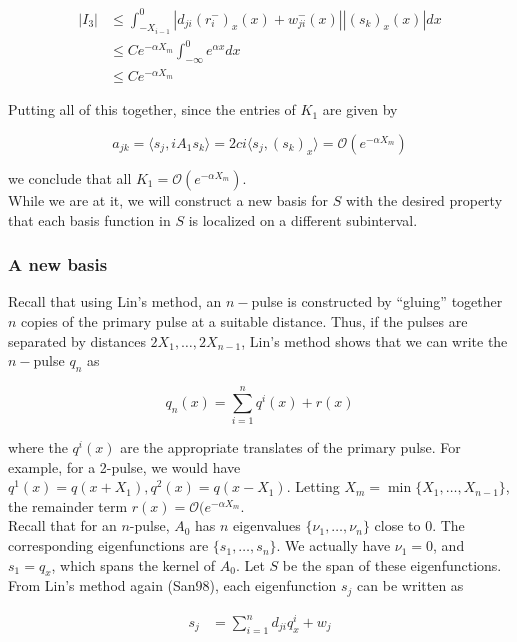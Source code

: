 \documentclass[12pt]{article}
\begin{document}
\begin{align*}
|I_3| &\leq \int_{-X_{i-1}}^0 |d_{ji}(r_i^-)_x(x) + w_{ji}^-(x)||(s_k)_x(x)| dx \\
&\leq C e^{-\alpha X_m} \int_{-\infty}^0 e^{\alpha x} dx \\
&\leq C e^{-\alpha X_m} 
\end{align*}

Putting all of this together, since the entries of $K_1$ are given by

\[
a_{jk} = \langle s_j, i A_1 s_k \rangle = 2 c i \langle s_j, (s_k)_x \rangle = \mathcal{O}(e^{-\alpha X_m} )
\]

we conclude that all $K_1 = \mathcal{O}(e^{-\alpha X_m} )$.\\

While we are at it, we will construct a new basis for $S$ with the desired property that each basis function in $S$ is localized on a different subinterval.

\subsubsection{A new basis}

Recall that using Lin's method, an $n-$pulse is constructed by ``gluing'' together $n$ copies of the primary pulse at a suitable distance. Thus, if the pulses are separated by distances $2 X_1, \dots, 2 X_{n-1}$, Lin's method shows that we can write the $n-$pulse $q_n$ as

\[
q_n(x) = \sum_{i = 1}^n q^i(x) + r(x)
\]

where the $q^i(x)$ are the appropriate translates of the primary pulse. For example, for a 2-pulse, we would have $q^1(x) = q(x + X_1), q^2(x) = q(x - X_1)$. Letting $X_m = \min\{ X_1, \dots, X_{n-1} \}$, the remainder term $r(x) = \mathcal{O}(e^{-\alpha X_m}$.\\

Recall that for an $n$-pulse, $A_0$ has $n$ eigenvalues $\{ \nu_1, \dots, \nu_n \}$ close to 0. The corresponding eigenfunctions are $\{ s_1, \dots, s_n \}$. We actually have $\nu_1 = 0$, and $s_1 = q_x$, which spans the kernel of $A_0$. Let $S$ be the span of these eigenfunctions. \\

From Lin's method again (San98), each eigenfunction $s_j$ can be written as

\begin{align*}
s_j &= \sum_{i = 1}^n d_{ji} q^i_x + w_j \\ 
\end{align*}
\end{document}
